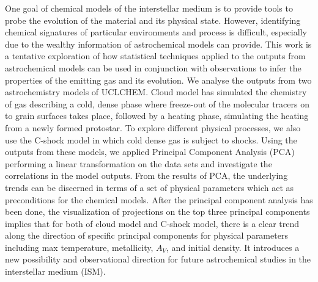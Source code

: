 \documentclass{aa}
\begin{document}
\begin{CJK*}{UTF8}{gbsn}
  \abstract
   {One goal of chemical models of the interstellar medium is to provide tools to probe the evolution of the material and its physical state. However, identifying chemical signatures of particular environments and process is difficult, especially due to the wealthy information of astrochemical models can provide.}
   {This work is a tentative exploration of how statistical techniques applied to the outputs from astrochemical models can be used in conjunction with observations to infer the properties of the emitting gas and its evolution.}
   {We analyse the outputs from two astrochemistry models of UCLCHEM. Cloud model has simulated the chemistry of gas describing a cold, dense phase where freeze-out of the molecular tracers on to grain surfaces takes place, followed by a heating phase, simulating the heating from a newly formed protostar. To explore different physical processes, we also use the C-shock model in which cold dense gas is subject to shocks. 
   Using the outputs from these models, we applied Principal Component Analysis (PCA) performing a linear transformation on the data sets and investigate the correlations in the model outputs. 
   From the results of PCA, the underlying trends can be discerned in terms of a set of physical parameters which act as preconditions for the chemical models.}
   {
    After the principal component analysis has been done, the visualization of projections on the top three principal components implies that for both of cloud model and C-shock model, there is a clear trend along the direction of specific principal components for physical parameters including max temperature, metallicity, $A_V$, and initial density. It introduces a new possibility and observational direction for future astrochemical studies in the interstellar medium (ISM).}
   {}

   \maketitle
%


\end{CJK*}
\end{document}
